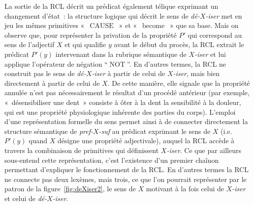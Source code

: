 \documentclass[output=paper]{langsci/langscibook}
\begin{document}
La sortie de la RCL décrit un prédicat également télique exprimant un changement d'état~: la structure logique qui décrit le sens de \emph{\mbox{dé-$X$-iser}} met en jeu les mêmes primitives «~$\operatorname{CAUSE}$~» et «~$\operatorname{become}$~» que sa base.  Mais on observe que, pour représenter la privation de la propriété $P'$ qui correspond au sens de l'adjectif $X$ et qui qualifie $y$ avant le début du procès, la RCL extrait le prédicat $P'(y)$ intervenant dans la rubrique sémantique de \emph{\mbox{$X$-iser}} et lui applique l'opérateur de négation ``$\operatorname{NOT}$''.  En d'autres termes, la RCL ne construit pas le sens de \emph{\mbox{dé-$X$-iser}} à partir de celui de \emph{\mbox{$X$-iser}}, mais bien directement à partir de celui de $X$.  De cette manière, elle signale que la propriété annulée n'est pas nécessairement le résultat d'un procédé antérieur (par exemple, «~désensibiliser une dent~» consiste à ôter à la dent la sensibilité à la douleur, qui est une propriété physiologique inhérente des parties du corps).  L'emploi d'une représentation formelle du sens permet ainsi à \citet{Fradin03} de connecter directement la structure sémantique de \emph{\mbox{pref-$X$-suf}} au prédicat exprimant le sens de $X$ (i.e. $P'(y)$ quand $X$ désigne une propriété adjectivale), auquel la RCL accède à travers la combinaison de primitives qui définissent \emph{\mbox{$X$-iser}}.  Ce que par ailleurs sous-entend cette représentation, c'est l'existence d'un premier chaînon permettant d'expliquer le fonctionnement de la RCL. En d'autres termes la RCL ne connecte pas deux lexèmes, mais trois, ce que l'on pourrait représenter par le patron de la figure~\ref{fig:deXiser2}, le sens de $X$ motivant à la fois celui de \emph{\mbox{$X$-iser}} et celui de \emph{\mbox{dé-$X$-iser}}.
\end{document}
